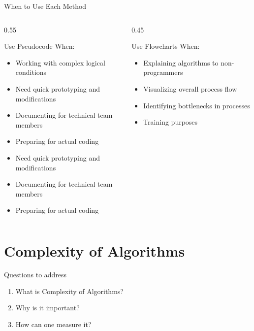 \documentclass[aspectratio=169]{beamer}
\begin{document}
\begin{frame}{When to Use Each Method}

  \begin{columns}[T]
    \begin{column}{0.55\textwidth}
\begin{block}{Use Pseudocode When:}
\begin{itemize}
    \item Working with complex logical conditions
    \item Need quick prototyping and modifications
    \item Documenting for technical team members
    \item Preparing for actual coding
    \item Need quick prototyping and modifications
    \item Documenting for technical team members
    \item Preparing for actual coding
\end{itemize}
\end{block}
    \end{column}
    \begin{column}{0.45\textwidth}
      \begin{block}{Use Flowcharts When:}
\begin{itemize}
    \item Explaining algorithms to non-programmers
    \item Visualizing overall process flow
    \item Identifying bottlenecks in processes
    \item Training purposes
    \end{itemize}
\end{block}
    \end{column}
  \end{columns}



\end{frame}




\section{Complexity of Algorithms}



\begin{frame}{Questions to address}

  \begin{enumerate}
      \item What is Complexity of Algorithms?
      \item Why is it important?
      \item How can one measure it?
  \end{enumerate}
\end{frame}
\end{document}
